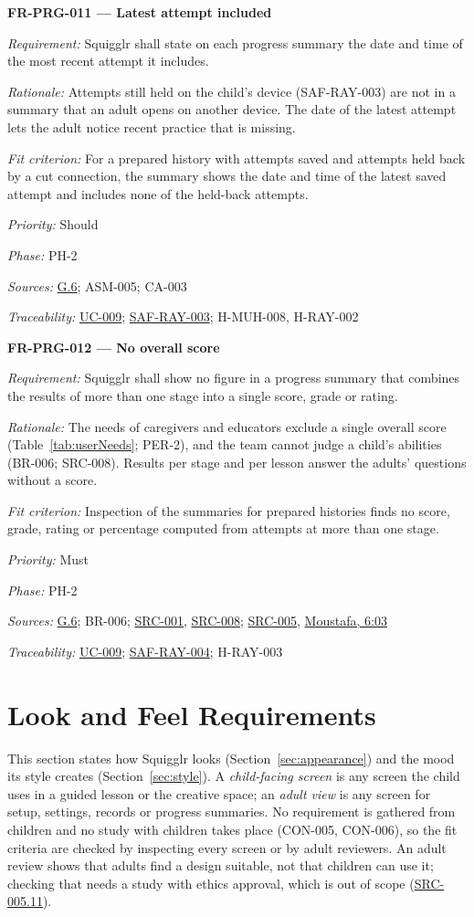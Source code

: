 \documentclass[12pt]{article}
\renewcommand{\_}{\textunderscore\allowbreak}%
\newcommand{\intlink}[3]{\hyperref[int:#1-#2]{#3}}
\newcommand{\intref}[2]{\intlink{#1}{#2}{#1, #2}}
\newcommand{\goalref}[1]{\hyperref[goal:#1]{G.#1}}
\newcommand{\ucref}[1]{\hyperref[uc:#1]{\mbox{UC-#1}}}
\newenvironment{srsrequirement}[2]{%
  \par\medskip\noindent\phantomsection\label{req:#1}%
  \textbf{#1 --- #2}\par\nobreak\smallskip }{\par\medskip}
\newcommand{\reqfield}[2]{\noindent\textit{#1:} #2\par}
\newcommand{\reqshall}[1]{\reqfield{Requirement}{#1}}
\newcommand{\reqrationale}[1]{\reqfield{Rationale}{#1}}
\newcommand{\reqfit}[1]{\reqfield{Fit criterion}{#1}}
\newcommand{\reqpriority}[1]{\reqfield{Priority}{#1}}
\newcommand{\reqphase}[1]{\reqfield{Phase}{#1}}
\newcommand{\reqsources}[1]{\reqfield{Sources}{#1}}
\newcommand{\reqtraces}[1]{\reqfield{Traceability}{#1}}
\newcommand{\reqref}[1]{\hyperref[req:#1]{#1}}
\newcommand{\srcref}[1]{\hyperref[src:#1]{SRC-#1}}
\providecommand{\ucref}[1]{\hyperref[uc:#1]{UC-#1}}
\begin{document}
\begin{srsrequirement}{FR-PRG-011}{Latest attempt included}
  \reqshall{Squigglr shall state on each progress summary the date and time of
the most recent attempt it includes.} \reqrationale{Attempts still held on the
child's device (SAF-RAY-003) are not in a summary that an adult opens on another
device. The date of the latest attempt lets the adult notice recent practice
that is missing.} \reqfit{For a prepared history with attempts saved and
attempts held back by a cut connection, the summary shows the date and time of
the latest saved attempt and includes none of the held-back attempts.}
  \reqpriority{Should}
  \reqphase{PH-2}
  \reqsources{\goalref{6}; ASM-005; CA-003} \reqtraces{\ucref{009};
  \reqref{SAF-RAY-003}; H-MUH-008, H-RAY-002}
\end{srsrequirement}

\begin{srsrequirement}{FR-PRG-012}{No overall score}
  \reqshall{Squigglr shall show no figure in a progress summary that combines
the results of more than one stage into a single score, grade or rating.}
\reqrationale{The needs of caregivers and educators exclude a single overall
score (Table~\ref{tab:userNeeds}; PER-2), and the team cannot judge a child's
abilities (BR-006; SRC-008). Results per stage and per lesson answer the adults'
questions without a score.} \reqfit{Inspection of the summaries for prepared
histories finds no score, grade, rating or percentage computed from attempts at
more than one stage.}
  \reqpriority{Must}
  \reqphase{PH-2}
  \reqsources{\goalref{6}; BR-006; \srcref{001}, \srcref{008}; \srcref{005},
\intref{Moustafa}{6:03}} \reqtraces{\ucref{009}; \reqref{SAF-RAY-004};
H-RAY-003}
\end{srsrequirement}

\section{Look and Feel Requirements}
\label{sec:look-feel}
\begingroup
\sloppy

This section states how Squigglr looks (Section~\ref{sec:appearance}) and the
mood its style creates (Section~\ref{sec:style}). A \emph{child-facing screen}
is any screen the child uses in a guided lesson or the creative space; an
\emph{adult view} is any screen for setup, settings, records or progress
summaries. No requirement is gathered from children and no study with children
takes place (CON-005, CON-006), so the fit criteria are checked by inspecting
every screen or by adult reviewers. An adult review shows that adults find a
design suitable, not that children can use it; checking that needs a study with
ethics approval, which is out of scope (\srcref{005.11}).
\end{document}
